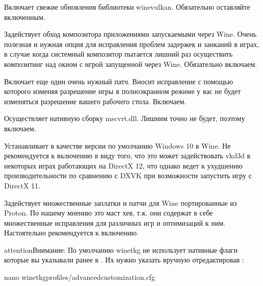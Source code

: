 \documentclass[letterpaper,10pt,russian,openany]{sphinxmanual}
\begin{document}
\sphinxAtStartPar
{} \sphinxhyphen{} Включает свежие обновления библиотеки winevulkan. Обязательно оставляйте включенным.

\sphinxAtStartPar
{} \sphinxhyphen{} Задействует обход композитора приложениями запускаемыми через Wine.
Очень полезная и нужная опция для исправления проблем задержек и заиканий в играх,
в случае когда системный композитор пытается лишний раз осуществить композитинг над окном с игрой запущенной через Wine.
Обязательно включаем.

\sphinxAtStartPar
{} \sphinxhyphen{} Включает еще один очень нужный патч.
Вносит исправление  с помощью которого изменяя разрешение игры в полноэкранном режиме у вас не будет изменяться разрешение вашего рабочего стола. Включаем.

\sphinxAtStartPar
{} \sphinxhyphen{} Осуществляет нативную сборку mscvrt.dll. Лишним точно не будет, поэтому включаем.

\sphinxAtStartPar
{} \sphinxhyphen{} Устанавливает в качестве версии по умолчанию Windows 10 в Wine.
Не рекомендуется к включению в виду того, что это может задействовать vkd3d в некоторых играх работающих на DirectX 12,
что однако ведет к ухудшению производительности по сравнению с DXVK при возможности запустить игру с DirectX 11.

\sphinxAtStartPar
{} \sphinxhyphen{} Задействует множественные заплатки и патчи для Wine портированные из Proton.
По нашему мнению это маст хев, т.к. они содержат в себе множественные исправления для различных игр и оптимизаций к ним.
Настоятельно рекомендуется к включению.

\begin{sphinxadmonition}{attention}{Внимание:}
\sphinxAtStartPar
По умолчанию wine\sphinxhyphen{}tkg не использует нативные флаги которые вы указывали ранее в .
Их нужно указать вручную отредактировав :

\begin{sphinxVerbatim}[commandchars=\\\{\}]
nano wine\PYGZhy{}tkg\PYGZhy{}profiles/advanced\PYGZhy{}customization.cfg 


\end{sphinxVerbatim}
\end{sphinxadmonition}
\end{document}

